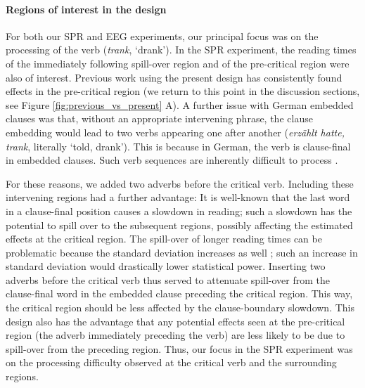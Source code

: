 \documentclass[review,preprint,12pt,authoryear,floatsintext]{elsarticle}
\begin{document}
\paragraph{Regions of interest in the design}
For both our SPR and EEG experiments, our principal focus was on the processing of the verb (\textit{trank}, `drank'). In the SPR experiment, the reading times of the immediately following spill-over region and of the pre-critical region were also of interest. Previous work using the present design \citep{vandyke07,mertzen} has consistently found effects in the pre-critical region (we return to this point in the discussion sections, see Figure \ref{fig:previous_vs_present} A). A further issue with German embedded clauses \citep[also see][]{mertzen} was that, without an appropriate intervening phrase, the clause embedding would lead to two verbs appearing one after another (\textit{erzählt hatte, trank}, literally `told, drank'). This is because in German, the verb is clause-final in embedded clauses. Such verb sequences are inherently difficult to process \citep{VSLK11,bach1986crossed}. 

For these reasons, we added two adverbs before the critical verb. Including these intervening regions had a further advantage: 
It is well-known \citep[e.g., ][]{rayner2000effect} that the last word in a clause-final position causes a slowdown in reading; such a slowdown has the potential to spill over to the subsequent regions, possibly affecting the estimated effects at the critical region. The spill-over of longer reading times can be problematic because the standard deviation increases as well \citep{wagenmakers2007linear}; such an increase in standard deviation would drastically lower statistical power. 
Inserting two adverbs before the critical verb thus served to attenuate spill-over from the clause-final word in the embedded clause preceding the critical region. This way, the critical region should be less affected by the clause-boundary slowdown. This design also has the advantage that any potential effects seen at the pre-critical region (the adverb immediately preceding the verb) are less likely to be due to spill-over from the preceding region. Thus, our focus in the SPR experiment was on the processing difficulty observed at the critical verb and the surrounding regions.
\end{document}
